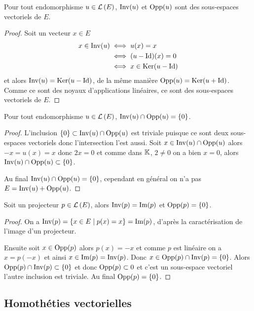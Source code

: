 \begin{prop}
  Pour tout endomorphisme \(u \in \mathcal{L}\left(E\right)\), \(\operatorname{Inv}(u)\) et \(\operatorname{Opp}(u)\) sont
  des sous-espaces vectoriels de \(E\).
\end{prop}
\begin{proof}
  Soit un vecteur \(x \in E\)
  \begin{align}
    x \in \operatorname{Inv}(u) &\iff u(x) = x \\
    &\iff (u-\operatorname{Id})(x)=0 \\
    &\iff x \in \operatorname{Ker}(u-\operatorname{Id})
  \end{align}
  et alors \(\operatorname{Inv}(u) = \operatorname{Ker}(u-\operatorname{Id})\), de la même manière \(\operatorname{Opp}(u) =
  \operatorname{Ker}(u+\operatorname{Id})\). Comme ce sont des noyaux d'applications linéaires, ce sont des
  sous-espaces vectoriels de \(E\).
\end{proof}

\begin{prop}
  Pour tout endomorphisme \(u \in \mathcal{L}\left(E\right)\), \(\operatorname{Inv}(u) \cap \operatorname{Opp}(u) = \{0\}\).
\end{prop}
\begin{proof}
  L'inclusion \(\{0\} \subset \operatorname{Inv}(u) \cap \operatorname{Opp}(u)\) est triviale puisque ce
  sont deux sous-espaces vectoriels donc l'intersection l'est aussi. Soit \(x
  \in \operatorname{Inv}(u) \cap \operatorname{Opp}(u)\) alors \(-x=u(x)=x\) donc \(2x=0\) et comme dans
  \(\mathbb{K}\), \(2\neq 0\) on a bien \(x=0\), alors \(\operatorname{Inv}(u) \cap \operatorname{Opp}(u) \subset
  \{0\}\).

  Au final \(\operatorname{Inv}(u) \cap \operatorname{Opp}(u) = \{0\}\), cependant en général on n'a pas \(E
  = \operatorname{Inv}(u)+\operatorname{Opp}(u)\).
\end{proof}

\begin{prop}
  Soit un projecteur \(p \in \mathcal{L}\left(E\right)\), alors \(\operatorname{Inv}(p)=\operatorname{Im}(p)\) et
  \(\operatorname{Opp}(p)=\{0\}\).
\end{prop}
\begin{proof}
  On a \(\operatorname{Inv}(p)=\left\{x \in E\mathrel{}\middle|\mathrel{}p(x)=x\right\}=\operatorname{Im}(p)\), d'après la caractérisation
  de l'image d'un projecteur.

  Ensuite soit \(x \in \operatorname{Opp}(p)\) alors \(p(x)=-x\) et comme \(p\) est linéaire
  on a \(x=p(-x)\) et ainsi \(x \in \operatorname{Im}(p)=\operatorname{Inv}(p)\). Donc \(x \in \operatorname{Opp}(p)
  \cap \operatorname{Inv}(p)= \{0\}\).
  Alors \(\operatorname{Opp}(p) \cap \operatorname{Inv}(p) \subset \{0\}\) et donc \(\operatorname{Opp}(p) \subset {0}\)
  et c'est un sous-espace vectoriel l'autre inclusion est triviale. Au final
  \(\operatorname{Opp}(p)=\{0\}\).
\end{proof}

\subsection{Homothéties vectorielles}


